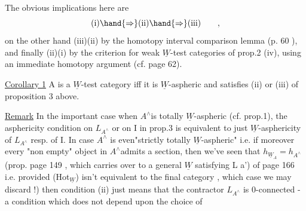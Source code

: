 The obvious implications here are
\[ \text{(i)}\hand{\Rightarrow}\text{(ii)}\hand{\Rightarrow}\text{(iii)} \qquad , \]
on the other hand  (iii)\hand{$\Rightarrow$}(ii)  by the homotopy interval comparison
lemma  (p. 60 ),  and finally (ii)\hand{$\Rightarrow$}(i)    by the criterion 
for weak $\underline{W}$-test categories of prop.2 (iv),  using an immediate homotopy
argument (cf. page 62).

\uline{Corollary 1} A is a $\underline{W}$-test category iff it is $\underline{W}$-aspheric and satisfies
(ii) or (iii) of proposition 3 above.

\uline{Remark}  In the important case when $A^\wedge$\hand{/}is totally $\underline{W}$-aspheric (cf. prop.1),
the asphericity condition on $L_{A^\wedge}$ or on I in prop.3  is equivalent to
just $\underline{W}$-asphericity of $L_{A^\wedge}$ resp. of I.  In case $A^\wedge$ is even"strictly
totally $\underline{W}$-aspheric"  i.e. if moreover every  "non empty" object in
$A^\wedge$admits a section,  then we've seen that $h_{\underline{W}_A} = h_{A^\wedge}$  (prop. page 149 ,
which carries over to a general $\underline{W}$ satisfying L a') of page 166\hand{,} i.e.
provided (Hot$_{\underline{W}}$)  isn't equivalent to the final category ,  which case we
may discard !)\hand{,} then condition (ii) just means that the contractor $L_{A^\wedge}$
\margin{$\|$} is 0-connected  -  a condition which does not depend upon the choice of

